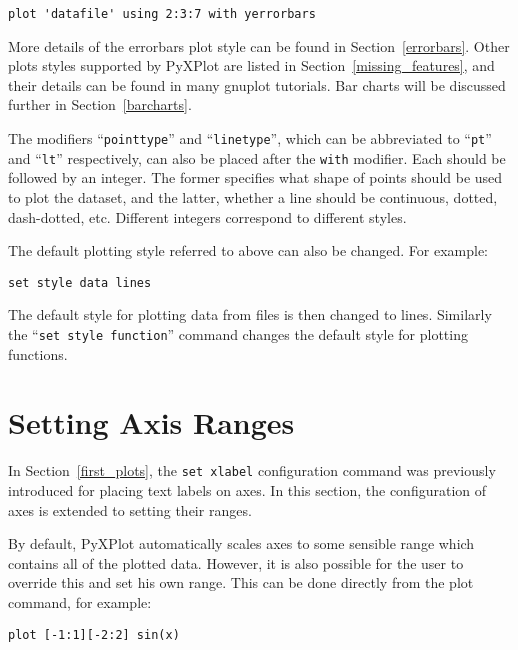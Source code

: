 \documentclass[a4paper,onecolumn,11pt]{book}
\begin{document}
\begin{verbatim}
plot 'datafile' using 2:3:7 with yerrorbars
\end{verbatim}

More details of the errorbars plot style can be found in
Section~\ref{errorbars}. Other plots styles supported by PyXPlot are listed in
Section~\ref{missing_features}, and their details can be found in many gnuplot
tutorials. Bar charts will be discussed further in Section~\ref{barcharts}.

The modifiers ``\texttt{pointtype}'' and ``\texttt{linetype}''\label{pointtype_modifier}, which can be
abbreviated to ``\texttt{pt}'' and ``\texttt{lt}'' respectively, can also be
placed after the \texttt{with} modifier. Each should be followed by an integer.
The former specifies what shape of points should be used to plot the dataset,
and the latter, whether a line should be continuous, dotted, dash-dotted, etc.
Different integers correspond to different styles.

The default plotting style referred to above can also be changed.  For example:

\begin{verbatim}
set style data lines
\end{verbatim}

\noindent The default style for plotting data from files is then changed to
lines.  Similarly the ``{\tt set style function}'' command changes the default style for
plotting functions.

\section{Setting Axis Ranges}

In Section~\ref{first_plots}, the \texttt{set xlabel} configuration command was
previously introduced for placing text labels on axes. In this section, the
configuration of axes is extended to setting their ranges.

By default, PyXPlot automatically scales axes to some sensible range which
contains all of the plotted data. However, it is also possible for the user to
override this and set his own range. This can be
done directly from the plot command, for example:

\begin{verbatim}
plot [-1:1][-2:2] sin(x)
\end{verbatim}
\label{plot_ranges}
\end{document}
